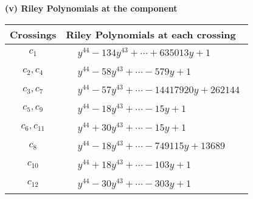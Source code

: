 \documentclass[1p]{elsarticle_modified}
\theoremstyle{definition}
\begin{document}
\newpage\renewcommand{\arraystretch}{1}
\flushleft \textbf{(v) Riley Polynomials at the component}\newline \\
\begin{tabular}{m{50pt}|m{274pt}}
Crossings & \hspace{64pt}Riley Polynomials at each crossing \\
\hline $$\begin{aligned}c_{1}\end{aligned}$$&$\begin{aligned}
&y^{44}-134 y^{43}+\cdots+635013 y+1
\end{aligned}$\\
\hline $$\begin{aligned}c_{2},c_{4}\end{aligned}$$&$\begin{aligned}
&y^{44}-58 y^{43}+\cdots-579 y+1
\end{aligned}$\\
\hline $$\begin{aligned}c_{3},c_{7}\end{aligned}$$&$\begin{aligned}
&y^{44}-57 y^{43}+\cdots-14417920 y+262144
\end{aligned}$\\
\hline $$\begin{aligned}c_{5},c_{9}\end{aligned}$$&$\begin{aligned}
&y^{44}-18 y^{43}+\cdots-15 y+1
\end{aligned}$\\
\hline $$\begin{aligned}c_{6},c_{11}\end{aligned}$$&$\begin{aligned}
&y^{44}+30 y^{43}+\cdots-15 y+1
\end{aligned}$\\
\hline $$\begin{aligned}c_{8}\end{aligned}$$&$\begin{aligned}
&y^{44}-18 y^{43}+\cdots-749115 y+13689
\end{aligned}$\\
\hline $$\begin{aligned}c_{10}\end{aligned}$$&$\begin{aligned}
&y^{44}+18 y^{43}+\cdots-103 y+1
\end{aligned}$\\
\hline $$\begin{aligned}c_{12}\end{aligned}$$&$\begin{aligned}
&y^{44}-30 y^{43}+\cdots-303 y+1
\end{aligned}$\\
\hline
\end{tabular}\\~\\
\end{document}

